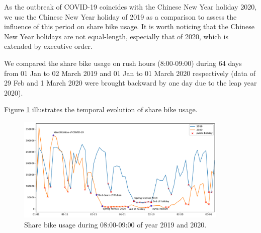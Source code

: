 \documentclass[ijgi,submit,moreauthors,pdftex]{Definitions/mdpi}
\begin{document}
As the outbreak of COVID-19 coincides with the Chinese New Year holiday 2020, we use the Chinese New Year holiday of 2019 as a comparison to assess the influence of this period on share bike usage.
It is worth noticing that the Chinese New Year holidays are not equal-length, especially that of 2020, which is extended by executive order.

We compared the share bike usage on rush hours (8:00-09:00) during 64 days from 01 Jan to 02 March 2019 and 01 Jan to 01 March 2020 respectively (data of 29 Feb and 1 March 2020 were brought backward by one day due to the leap year 2020).


Figure \ref{fig:hour_comparison_8} %
 illustrates the temporal evolution of share bike usage.

\begin{figure}[ht]
    \centering
    \includegraphics[width=0.9\textwidth]{Figures/hour_8-eps-converted-to.pdf}
    \caption{Share bike usage during 08:00-09:00 of year 2019 and 2020.}
    \label{fig:hour_comparison_8}
\end{figure}
\end{document}
